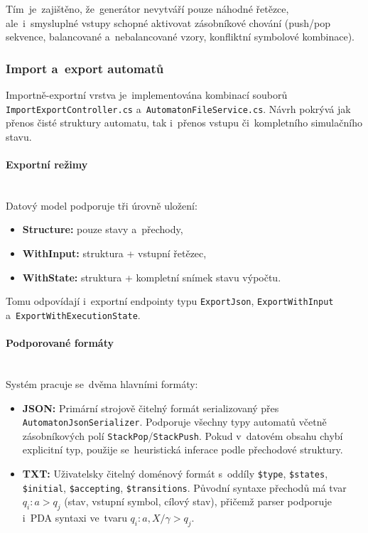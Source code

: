 \documentclass[
  master,
  program=ainfvs,
  printversion,
  figures=false,
  tables=false,
  glossaries,
  index
]{kidiplom}
\begin{document}
Tím~je~zajištěno, že~generátor nevytváří pouze náhodné řetězce, ale~i~smysluplné vstupy schopné aktivovat zásobníkové chování (push/pop sekvence, balancované a~nebalancované vzory, konfliktní symbolové kombinace).

\subsubsection{Import a~export automatů}

Importně-exportní vrstva je~implementována kombinací souborů \texttt{Import\-Ex\-po\-rt\-Controller.cs} a~\texttt{Automaton\-File\-Service.cs}. Návrh pokrývá jak přenos čisté struktury automatu, tak i~přenos vstupu či~kompletního simulačního stavu.

\paragraph{Exportní režimy} \mbox{} \\
Datový model podporuje tři úrovně uložení:

\begin{itemize}
    \item \textbf{Structure:} pouze stavy a~přechody,
    \item \textbf{WithInput:} struktura + vstupní řetězec,
    \item \textbf{WithState:} struktura + kompletní snímek stavu výpočtu.
\end{itemize}

Tomu odpovídají i~exportní endpointy typu \texttt{ExportJson}, \texttt{Ex\-po\-rt\-Wi\-th\-In\-put} a~\texttt{Export\-With\-Execution\-State}.

\paragraph{Podporované formáty} \mbox{} \\
Systém pracuje se~dvěma hlavními formáty:

\begin{itemize}
    \item \textbf{JSON:} Primární strojově čitelný formát serializovaný přes \texttt{Automaton\-Json\-Serializer}. Podporuje všechny typy automatů včetně zásobníkových polí \texttt{Stack\-Pop}/\texttt{Stack\-Push}. Pokud v~datovém obsahu chybí explicitní typ, použije se~heuristická inferace podle přechodové struktury.
    \item \textbf{TXT:} Uživatelsky čitelný doménový formát s~oddíly \texttt{\$type}, \texttt{\$states}, \texttt{\$initial}, \texttt{\$accepting}, \texttt{\$transitions}. Původní syntaxe přechodů má tvar $q_i:a>q_j$ (stav, vstupní symbol, cílový stav), přičemž parser podporuje i~PDA syntaxi ve~tvaru $q_i:a,X/\gamma>q_j$.
\end{itemize}
\end{document}
